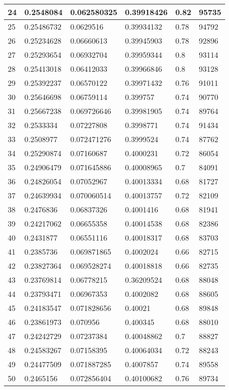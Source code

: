 \begin{longtable}{|l|l|l|l|l|l|}
24 & 0.2548084 & 0.062580325 & 0.39918426 & 0.82 & 95735 \\ \hline 
25 & 0.25486732 & 0.0629516 & 0.39934132 & 0.78 & 94792 \\ \hline 
26 & 0.25234628 & 0.06660613 & 0.39945903 & 0.78 & 92896 \\ \hline 
27 & 0.25293654 & 0.06932704 & 0.39959344 & 0.8 & 93114 \\ \hline 
28 & 0.25413018 & 0.06412033 & 0.39966846 & 0.8 & 93128 \\ \hline 
29 & 0.25392237 & 0.06570122 & 0.39971432 & 0.76 & 91011 \\ \hline 
30 & 0.25646698 & 0.06759114 & 0.399757 & 0.74 & 90770 \\ \hline 
31 & 0.25667238 & 0.069726646 & 0.39981905 & 0.74 & 89764 \\ \hline 
32 & 0.2533334 & 0.07227808 & 0.3998771 & 0.74 & 91434 \\ \hline 
33 & 0.2508977 & 0.072471276 & 0.3999524 & 0.74 & 87762 \\ \hline 
34 & 0.25290874 & 0.07160687 & 0.4000231 & 0.72 & 86054 \\ \hline 
35 & 0.24906479 & 0.071645886 & 0.40008965 & 0.7 & 84091 \\ \hline 
36 & 0.24826054 & 0.07052967 & 0.40013334 & 0.68 & 81727 \\ \hline 
37 & 0.24639934 & 0.070060514 & 0.40013757 & 0.72 & 82109 \\ \hline 
38 & 0.2476836 & 0.06837326 & 0.4001416 & 0.68 & 81941 \\ \hline 
39 & 0.24217062 & 0.06655358 & 0.40014538 & 0.68 & 82386 \\ \hline 
40 & 0.2431877 & 0.06551116 & 0.40018317 & 0.68 & 83703 \\ \hline 
41 & 0.2385736 & 0.069871865 & 0.4002024 & 0.66 & 82715 \\ \hline 
42 & 0.23827364 & 0.069528274 & 0.40018818 & 0.66 & 82735 \\ \hline 
43 & 0.23769814 & 0.06778215 & 0.36209524 & 0.68 & 88048 \\ \hline 
44 & 0.23793471 & 0.06967353 & 0.4002082 & 0.68 & 88605 \\ \hline 
45 & 0.24183547 & 0.071828656 & 0.40021 & 0.68 & 89848 \\ \hline 
46 & 0.23861973 & 0.070956 & 0.400345 & 0.68 & 88010 \\ \hline 
47 & 0.24242729 & 0.07237384 & 0.40048862 & 0.7 & 88827 \\ \hline 
48 & 0.24583267 & 0.07158395 & 0.40064034 & 0.72 & 88243 \\ \hline 
49 & 0.24477509 & 0.071887285 & 0.4007857 & 0.74 & 89558 \\ \hline 
50 & 0.2465156 & 0.072856404 & 0.40100682 & 0.76 & 89734 \\ \hline 
\end{longtable}